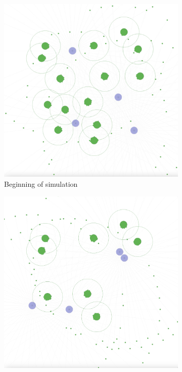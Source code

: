 \documentclass{scrartcl}
\begin{document}
\begin{figure}
  \centering
  \begin{subfigure}[b]{0.45\textwidth}
      \centering
      \includegraphics[width=\textwidth]{img/4_agents_1.png}
      \caption{Beginning of simulation}
  \end{subfigure}
  \hfill
  \begin{subfigure}[b]{0.45\textwidth}
      \centering
      \includegraphics[width=\textwidth]{img/4_agents_2.png}

\end{subfigure}
\end{figure}
\end{document}
